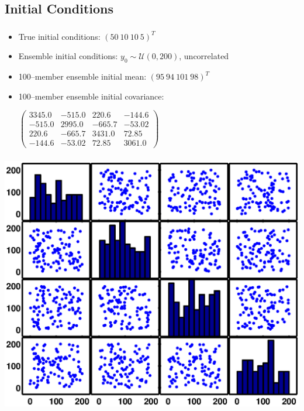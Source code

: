\documentclass[mathserif]{beamer}
\begin{document}
\subsection{Initial Conditions}

\begin{frame}
  \begin{center}
    \frametitle{\insertsubsection}
    \begin{itemize}
      \item True initial conditions: $(50\ 10\ 10\ 5)^T$
      \item Ensemble initial conditions: $y_0\sim\mathcal{U}(0,200)$, uncorrelated
      \item 100--member ensemble initial mean: $(95\ 94\ 101\ 98)^T$
      \item 100--member ensemble initial covariance:

      $\left(\begin{array}{cccc} 3345.0 & -515.0 & 220.6 & -144.6\\ -515.0 & 2995.0 & -665.7 & -53.02\\ 220.6 & -665.7 & 3431.0 & 72.85\\ -144.6 & -53.02 & 72.85 & 3061.0 \end{array}\right)$
    \end{itemize}
  \end{center}
\end{frame}

\begin{frame}
  \begin{center}
    \frametitle{\insertsubsection}
    \includegraphics[width=1\textwidth]{initcov}
  \end{center}
\end{frame}
\end{document}
